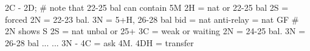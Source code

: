 2C - 2D;
# note that 22-25 bal can contain 5M
2H = nat or 22-25 bal
    2S = forced
        2N = 22-23 bal. 3N = 5+H, 26-28 bal
        bid = nat
    anti-relay = nat GF  # 2N shows S
2S = nat unbal or 25+
    3C = weak or waiting
2N = 24-25 bal. 3N = 26-28 bal ...
    ... 3N - 4C = ask 4M. 4DH = transfer
